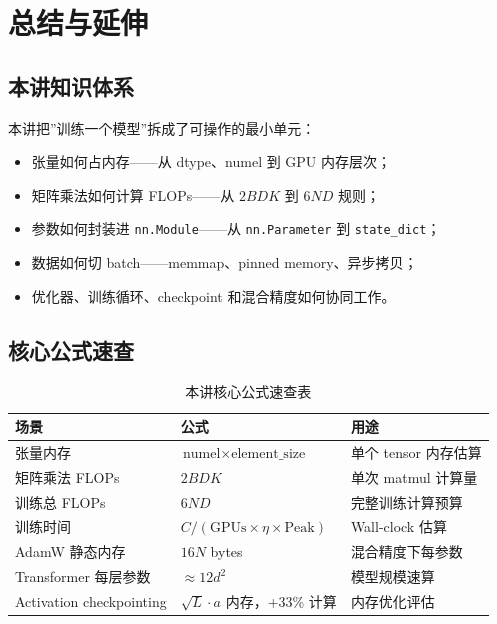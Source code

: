 \documentclass[a4paper]{article}
\begin{document}
\section{总结与延伸}

\subsection{本讲知识体系}

本讲把”训练一个模型”拆成了可操作的最小单元：
\begin{itemize}
    \item 张量如何占内存——从 dtype、numel 到 GPU 内存层次；
    \item 矩阵乘法如何计算 FLOPs——从 $2BDK$ 到 $6ND$ 规则；
    \item 参数如何封装进 \texttt{nn.Module}——从 \texttt{nn.Parameter} 到 \texttt{state\_dict}；
    \item 数据如何切 batch——memmap、pinned memory、异步拷贝；
    \item 优化器、训练循环、checkpoint 和混合精度如何协同工作。
\end{itemize}

\subsection{核心公式速查}

\begin{table}[H]
\centering
\begin{tabular}{p{}p{}p{}}
\toprule
\textbf{场景} & \textbf{公式} & \textbf{用途} \\
\midrule
张量内存 & $\text{numel} \times \text{element\_size}$ & 单个 tensor 内存估算 \\
矩阵乘法 FLOPs & $2BDK$ & 单次 matmul 计算量 \\
训练总 FLOPs & $6ND$ & 完整训练计算预算 \\
训练时间 & $C / (\text{GPUs} \times \eta \times \text{Peak})$ & Wall-clock 估算 \\
AdamW 静态内存 & $16N$ bytes & 混合精度下每参数 \\
Transformer 每层参数 & $\approx 12d^2$ & 模型规模速算 \\
Activation checkpointing & $\sqrt{L} \cdot a$ 内存，+33\% 计算 & 内存优化评估 \\
\bottomrule
\end{tabular}
\caption{本讲核心公式速查表}
\end{table}
\end{document}
